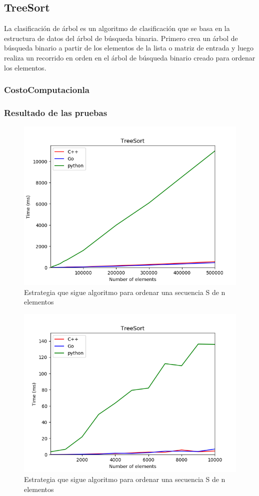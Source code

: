 \documentclass{article}
\begin{document}
    \subsection{TreeSort}
    La clasificación de árbol es un algoritmo de clasificación que se basa en la estructura de datos del árbol de búsqueda binaria. Primero crea un árbol de búsqueda binario a partir de los elementos de la lista o matriz de entrada y luego realiza un recorrido en orden en el árbol de búsqueda binario creado para ordenar los elementos.
        \subsubsection{CostoComputacionla}
        \subsubsection{Resultado de las pruebas}
        \begin{figure}[h!]
            \centering
            \includegraphics[width=12cm]{img/treeSort_1.png}
            \caption{Estrategia que sigue algoritmo para ordenar una secuencia S de n elementos}
            \label{fig:mergesort}
        \end {figure}        
        \begin{figure}[h!]
            \centering
            \includegraphics[width=12cm]{img/treeSort_2.png}
            \caption{Estrategia que sigue algoritmo para ordenar una secuencia S de n elementos}
            \label{fig:mergesort}
        \end {figure}

	
		
	
\end{document}
